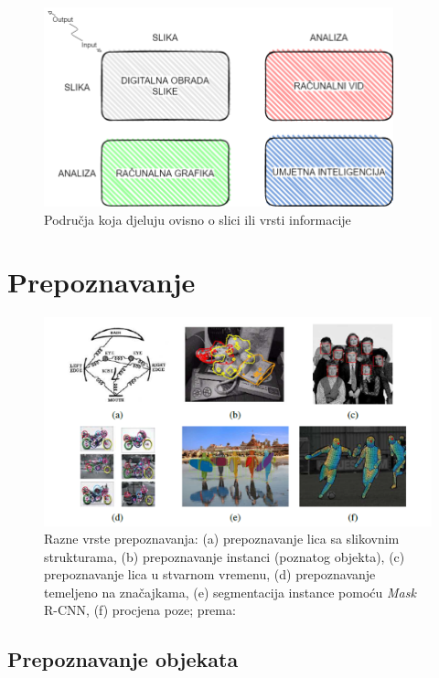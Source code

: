 \documentclass[]{foi} %
\begin{document}
\begin{figure}[!ht]
    \centering
    \includegraphics[width=0.9\textwidth]{slike/dip.png}
    \caption{Područja koja djeluju ovisno o slici ili vrsti informacije}
    \label{fig:dip}
\end{figure}

\newpage
\section{Prepoznavanje}

\begin{figure}[!ht]
    \centering
    \includegraphics[width=1\textwidth]{slike/prepoznavanje.png}
    \caption{Razne vrste prepoznavanja: (a) prepoznavanje lica sa slikovnim strukturama, (b) prepoznavanje instanci (poznatog objekta), (c) prepoznavanje lica u stvarnom vremenu, (d) prepoznavanje temeljeno na značajkama, (e) segmentacija instance pomoću \textit{Mask} R-CNN, (f) procjena poze; prema: \cite{szeliskicvaa}}
    \label{fig:prepoznavanje}
\end{figure}

\subsection{Prepoznavanje objekata}
\end{document}
